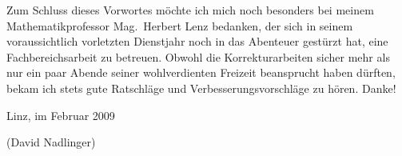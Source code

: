 Zum Schluss dieses Vorwortes möchte ich mich noch besonders bei meinem Mathematikprofessor Mag.~Herbert Lenz bedanken, der sich in seinem voraussichtlich vorletzten Dienstjahr noch in das Abenteuer gestürzt hat, eine Fachbereichsarbeit zu betreuen. Obwohl die Korrekturarbeiten sicher mehr als nur ein paar Abende seiner wohlverdienten Freizeit beansprucht haben dürften, bekam ich stets gute Ratschläge und Verbesserungsvorschläge zu hören. Danke!

\vspace{0.5cm}
Linz, im Februar 2009

\vspace{0.5cm}
{\small(David Nadlinger)}